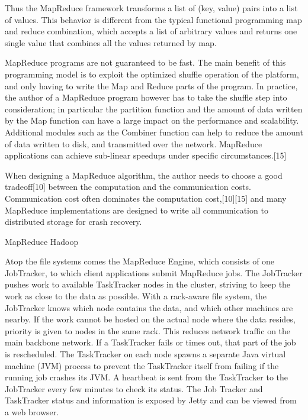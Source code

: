 \documentclass[conference]{IEEEtran}
\begin{document}
Thus the MapReduce framework transforms a list of (key, value) pairs into a list of values. This behavior is different from the typical functional programming map and reduce combination, which accepts a list of arbitrary values and returns one single value that combines all the values returned by map.




MapReduce programs are not guaranteed to be fast. The main benefit of this programming model is to exploit the optimized shuffle operation of the platform, and only having to write the Map and Reduce parts of the program. In practice, the author of a MapReduce program however has to take the shuffle step into consideration; in particular the partition function and the amount of data written by the Map function can have a large impact on the performance and scalability. Additional modules such as the Combiner function can help to reduce the amount of data written to disk, and transmitted over the network. MapReduce applications can achieve sub-linear speedups under specific circumstances.[15]

When designing a MapReduce algorithm, the author needs to choose a good tradeoff[10] between the computation and the communication costs. Communication cost often dominates the computation cost,[10][15] and many MapReduce implementations are designed to write all communication to distributed storage for crash recovery.





MapReduce Hadoop 


Atop the file systems comes the MapReduce Engine, which consists of one JobTracker, to which client applications submit MapReduce jobs. The JobTracker pushes work to available TaskTracker nodes in the cluster, striving to keep the work as close to the data as possible. With a rack-aware file system, the JobTracker knows which node contains the data, and which other machines are nearby. If the work cannot be hosted on the actual node where the data resides, priority is given to nodes in the same rack. This reduces network traffic on the main backbone network. If a TaskTracker fails or times out, that part of the job is rescheduled. The TaskTracker on each node spawns a separate Java virtual machine (JVM) process to prevent the TaskTracker itself from failing if the running job crashes its JVM. A heartbeat is sent from the TaskTracker to the JobTracker every few minutes to check its status. The Job Tracker and TaskTracker status and information is exposed by Jetty and can be viewed from a web browser.
\end{document}

